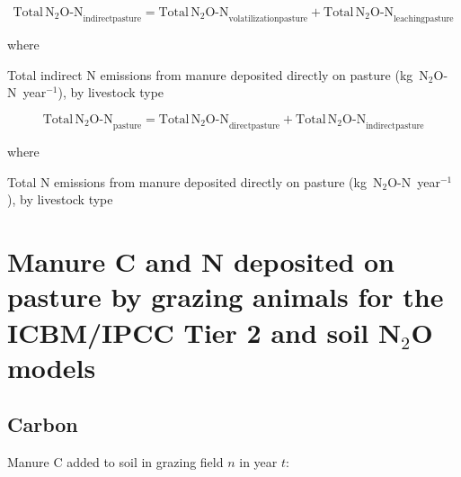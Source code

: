 \begin{equation}
    \mathrm{Total\,N_2O\text{-}N}_{\mathrm{indirectpasture}}
        = \mathrm{Total\,N_2O\text{-}N}_{\mathrm{volatilizationpasture}}
          + \mathrm{Total\,N_2O\text{-}N}_{\mathrm{leachingpasture}}
    \tag{Eq.\ 5.5.2-6}
\end{equation}

\noindent where

\begin{description}[font=\normalfont, leftmargin=12em, style=nextline, nosep]
    \item[$\mathrm{Total\,N_2O\text{-}N}_{\mathrm{indirectpasture}}$]
        Total indirect N emissions from manure deposited directly on pasture
        (kg~N$_2$O-N~year$^{-1}$), by livestock type
\end{description}

\begin{equation}
    \mathrm{Total\,N_2O\text{-}N}_{\mathrm{pasture}}
        = \mathrm{Total\,N_2O\text{-}N}_{\mathrm{directpasture}}
          + \mathrm{Total\,N_2O\text{-}N}_{\mathrm{indirectpasture}}
    \tag{Eq.\ 5.5.2-7}
\end{equation}

\noindent where

\begin{description}[font=\normalfont, leftmargin=12em, style=nextline, nosep]
    \item[$\mathrm{Total\,N_2O\text{-}N}_{\mathrm{pasture}}$]
        Total N emissions from manure deposited directly on pasture
        (kg~N$_2$O-N~year$^{-1}$), by livestock type
\end{description}

\section{Manure C and N deposited on pasture by grazing animals for the ICBM/IPCC Tier 2 and soil N\texorpdfstring{$_2$}{2}O models}
\label{sec:grazing-cn-model}

\subsection{Carbon}
\label{subsec:grazing-c-model}

Manure C added to soil in grazing field $n$ in year $t$:

